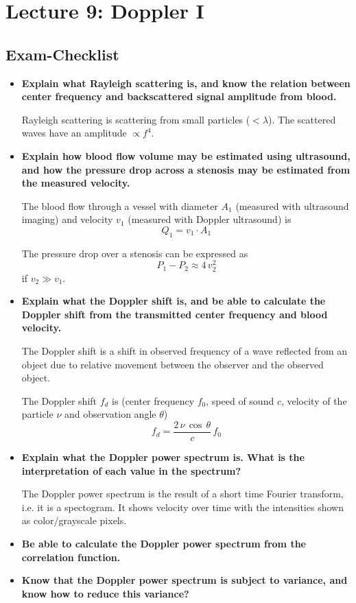 \documentclass[10pt,a4paper,noendnumber=true]{scrartcl}
\begin{document}
\newpage
\section{Lecture 9: Doppler I}

\subsection{Exam-Checklist}
\begin{itemize}
\item \textbf{Explain what Rayleigh scattering is, and know the relation between center frequency and backscattered signal amplitude from blood.}

Rayleigh scattering is scattering from small particles ($<\lambda$). The scattered waves have an amplitude $\propto f^4$.

\item \textbf{Explain how blood flow volume may be estimated using ultrasound, and how the pressure drop across a stenosis may be estimated from the measured velocity.}

The blood flow through a vessel with diameter $A_1$ (measured with ultrasound imaging) and velocity $v_1$ (measured with Doppler ultrasound) is
\begin{equation}
Q_1 = v_1 \cdot A_1
\end{equation}

The pressure drop over a stenosis can be expressed as
\begin{equation}
P_1 - P_2 \approx 4\,v_2^2
\end{equation}
if $v_2 \gg v_1$.

\item \textbf{Explain what the Doppler shift is, and be able to calculate the Doppler shift from the transmitted center frequency and blood velocity.}

The Doppler shift is a shift in observed frequency of a wave reflected from an object due to relative movement between the observer and the observed object.

The Doppler shift $f_d$ is (center frequency $f_0$, speed of sound $c$, velocity of the particle $\nu$ and observation angle $\theta$)
\begin{equation}
f_d = \frac{2\,\nu\,\cos\,\theta}{c}\,f_0
\end{equation}

\item \textbf{Explain what the Doppler power spectrum is. What is the interpretation of each value in the spectrum?}

The Doppler power spectrum is the result of a short time Fourier transform, i.e. it is a spectogram. It shows velocity over time with the intensities shown as color/grayscale pixels.

\item \textbf{Be able to calculate the Doppler power spectrum from the correlation function.}



\item \textbf{Know that the Doppler power spectrum is subject to variance, and know how to reduce this variance?}


\end{itemize}
\end{document}
